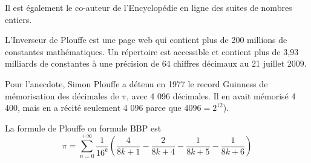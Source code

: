\documentclass[a4paper,11pt]{book}
\begin{document}
Il est \'egalement le co-auteur de l'Encyclop\'edie en ligne des suites de 
nombres entiers.

L'Inverseur de Plouffe est une page web qui contient plus de 200 millions de 
constantes math\'ematiques. Un r\'epertoire est accessible et contient plus de 
3,93 milliards de constantes \`a une pr\'ecision de 64 chiffres d\'ecimaux au 
21 juillet 2009.

Pour l'anecdote, Simon Plouffe a d\'etenu en 1977 le record Guinness de 
m\'emorisation des d\'ecimales de $\pi$, avec 4 096 d\'ecimales. Il en avait 
m\'emoris\'e 4 400, mais en a r\'ecit\'e seulement 4 096 parce que 
$4096=2^{12}$).

La formule de Plouffe ou formule BBP est 
$$\pi=\sum_{n=0}^{+\infty}\frac{1}{16^k}(\frac{4}{8k+1}-\frac{2}{8k+4}-\frac{1}{8k+5}-\frac{1}{8k+6})$$
\end{document}
